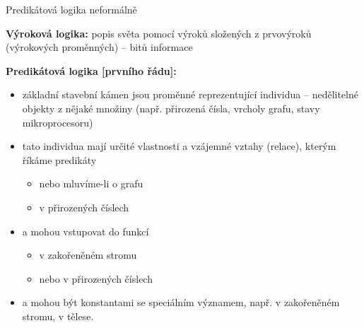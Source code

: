 \documentclass{beamer}
\begin{document}
\begin{frame}{Predikátová logika neformálně}

    \textbf{Výroková logika:} popis světa pomocí \alert{výroků} složených z \alert{prvovýroků} (\alert{výrokových proměnných}) -- bitů informace
    
    \textbf{Predikátová logika [prvního řádu]:}
    \begin{itemize}
        \item základní stavební kámen jsou \alert{proměnné} reprezentující \alert{individua} -- nedělitelné objekty z nějaké množiny (např. přirozená čísla, vrcholy grafu, stavy mikroprocesoru)
        \item tato individua mají určité vlastnosti a vzájemné vztahy (\alert{relace}), kterým říkáme \alert{predikáty}
        \begin{itemize}
            \item {}nebo  mluvíme-li o grafu
            \item {} v přirozených číslech
        \end{itemize}
        \item a mohou vstupovat do \alert{funkcí}
        \begin{itemize}
            \item {} v zakořeněném stromu
            \item {} nebo  v přirozených číslech
        \end{itemize}
        \item a mohou být \alert{konstantami} se speciálním významem, např.  v zakořeněném stromu, 
             v tělese. 
    \end{itemize}    

\end{frame}
\end{document}
